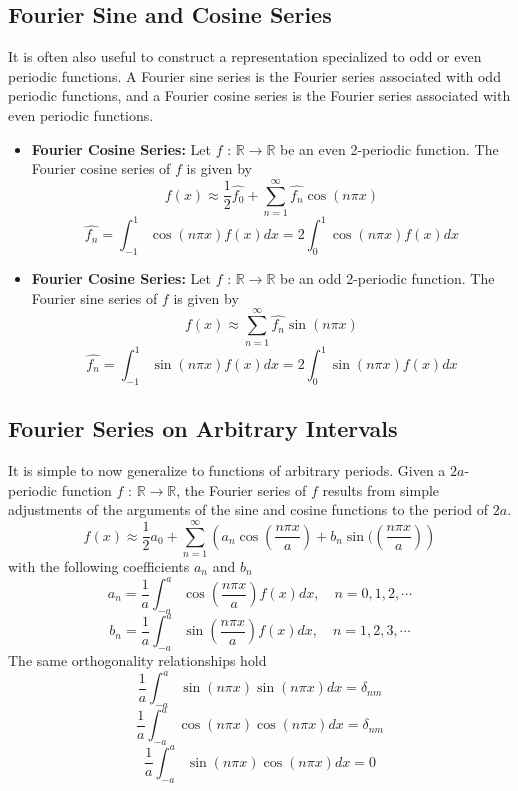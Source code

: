 \documentclass[11pt]{article}
\newcommand{\R}{\mathbb{R}}
\begin{document}
\subsection{Fourier Sine and Cosine Series}
It is often also useful to construct a representation specialized to odd or even periodic functions. A Fourier sine series is the Fourier series associated with odd periodic functions, and a Fourier cosine series is the Fourier series associated with even periodic functions.
\begin{itemize}
\item \textbf{Fourier Cosine Series:} Let $f$ : $\R \rightarrow \R$ be an even 2-periodic function. The Fourier
cosine series of $f$ is given by
$$ f(x) \approx \frac{1}{2} \hat{f_0} + \sum_{n=1}^{\infty}  \hat{f_n} \cos (n\pi x)$$
$$ \hat{f_n} = \int_{-1}^{1} \cos (n\pi x) f(x) dx = 2 \int_{0}^{1} \cos (n\pi x) f(x) dx$$ 

\item \textbf{Fourier Cosine Series:} Let $f$ : $\R \rightarrow \R$ be an odd 2-periodic function. The Fourier
sine series of $f$ is given by
$$ f(x) \approx  \sum_{n=1}^{\infty}  \hat{f_n} \sin (n\pi x)$$
$$ \hat{f_n} = \int_{-1}^{1} \sin (n\pi x) f(x) dx = 2 \int_{0}^{1} \sin (n\pi x) f(x) dx$$ 
\end{itemize}

\subsection{Fourier Series on Arbitrary Intervals}
It is simple to now generalize to functions of arbitrary periods. Given a $2a$-periodic function $f$ : $\R \rightarrow \R$, the Fourier series of $f$ results from simple adjustments of the arguments of the sine and cosine functions to the period of $2a$.
$$ f(x) \approx \frac{1}{2} a_0 + \sum_{n=1}^{\infty} \left( a_n \cos \left( \frac{n\pi x}{a}\right) + b_n \sin (\left( \frac{n\pi x}{a}\right) \right)$$
with the following coefficients $a_n$ and $b_n$
$$ a_n =   \frac{1}{a}\int_{-a}^{a} \cos \left( \frac{n\pi x}{a}\right) f(x) dx,  \quad n=0, 1,2, \cdots$$
$$ b_n =  \frac{1}{a} \int_{-a}^{a} \sin \left( \frac{n\pi x}{a}\right) f(x) dx,  \quad n=1,2,3, \cdots$$
The same orthogonality relationships hold 
$$ \frac{1}{a} \int _{-a}^{a} \sin (n\pi x)\sin (n\pi x)dx = \delta_{nm} $$ 
$$ \frac{1}{a} \int _{-a}^{a} \cos (n\pi x)\cos (n\pi x)dx =\delta_{nm} $$ 
$$ \frac{1}{a} \int _{-a}^{a} \sin (n\pi x)\cos (n\pi x)dx =0 $$ 


\pagebreak
\end{document}

